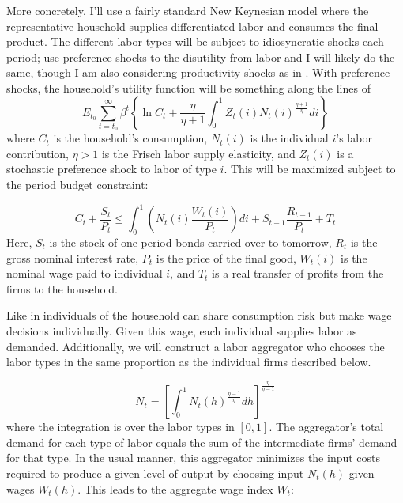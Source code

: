 \documentclass[12pt,a4paper]{article}            %
\begin{document}
More concretely, I'll use a fairly standard New Keynesian model where the representative household supplies differentiated labor and consumes the final product.
The different labor types will be subject to idiosyncratic shocks each period; \cite{daly_hobijn_2013} use preference shocks to the disutility from labor and I will likely do the same, though I am also considering productivity shocks as in \cite{fagan_messina_2009}. 
With preference shocks, the household's utility function will be something along the lines of
\begin{equation*}
    E_{t_0} \sum_{t=t_0}^{\infty} \beta^t \left\{\ln{C_t} + \frac{\eta}{\eta + 1} \int_{0}^{1} Z_t(i) N_t(i)^{\frac{\eta + 1}{\eta}} di \right\}
\end{equation*}
where $C_t$ is the household's consumption, $N_t(i)$ is the individual $i$'s labor contribution, $\eta > 1$ is the Frisch labor supply elasticity, and $Z_t(i)$ is a stochastic preference shock to labor of type $i$.
This will be maximized subject to the period budget constraint:

\begin{equation}
    C_t + \frac{S_t}{P_t} \leq \int_{0}^{1} \left( N_t(i) \frac{W_t(i)}{P_t}\right) di + S_{t-1}\frac{R_{t-1}}{P_t} + T_t
\end{equation}
Here, $S_t$ is the stock of one-period bonds carried over to tomorrow, $R_t$ is the gross nominal interest rate, $P_t$ is the price of the final good, $W_t(i)$ is the nominal wage paid to individual $i$, and $T_t$ is a real transfer of profits from the firms to the household.

Like in \cite{erceg_henderson_levin_1999} individuals of the household can share consumption risk but make wage decisions individually.
Given this wage, each individual supplies labor as demanded.  Additionally, we will construct a labor aggregator who chooses the labor types in the same proportion as the individual firms described below.

\begin{equation}
    N_t = \left[ \int_{0}^{1} N_t(h)^{ \frac{\eta - 1}{\eta} } dh \right]^{ \frac{\eta}{\eta - 1} }
\end{equation}
where the integration is over the labor types in $[0, 1]$. The aggregator's total demand for each type of labor equals the sum of the intermediate firms' demand for that type. In the usual manner, this aggregator minimizes the input costs required to produce a given level of output by choosing input $N_t(h)$ given wages $W_t(h)$.  This leads to the aggregate wage index $W_t$:
\end{document}
